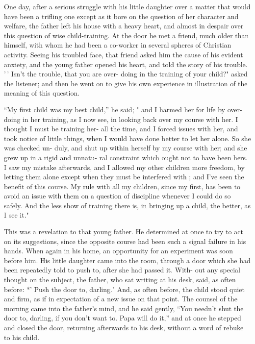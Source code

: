\documentclass[
]{book}
\begin{document}
One day, after a serious struggle with his little daughter over a matter that would have been a trifling one except as it bore on the question of her character and welfare, the father left his house with a heavy heart, and almost in despair over this question of wise child-training. At the door he met a friend, much older than himself, with whom he had been a co-worker in several spheres of Christian activity. Seeing his troubled face, that friend asked him the cause of his evident anxiety, and the young father opened his heart, and told the story of his trouble. '\,' Isn't the trouble, that you are over- doing in the training of your child?" asked the listener; and then he went on to give his own experience in illustration of the meaning of this question.

``My first child was my best child,'' he said; " and I harmed her for life by over-doing in her training, as I now see, in looking back over my course with her. I thought I must be training her- all the time, and I forced issues with her, and took notice of little things, when I would have done better to let her alone. So she was checked un- duly, and shut up within herself by my course with her; and she grew up in a rigid and unnatu- ral constraint which ought not to have been hers. I saw my mistake afterwards, and I allowed my other children more freedom, by letting them alone except when they must be interfered with ; and I've seen the benefit of this course. My rule with all my children, since my first, has been to avoid an issue with them on a question of discipline whenever I could do so safely. And the less show of training there is, in bringing up a child, the better, as I see it."

This was a revelation to that young father. He determined at once to try to act on its suggestions, since the opposite course had been such a signal failure in his hands. When again in his home, an opportunity for an experiment was soon before him. His little daughter came into the room, through a door which she had been repeatedly told to push to, after she had passed it. With- out any special thought on the subject, the father, who sat writing at his desk, said, as often before: *' Push the door to, darling." And, as often before, the child stood quiet and firm, as if in expectation of a new issue on that point. The counsel of the morning came into the father's mind, and he said gently, ``You needn't shut the door to, darling, if you don't want to. Papa will do it,'' and at once he stepped and closed the door, returning afterwards to his desk, without a word of rebuke to his child.
\end{document}
